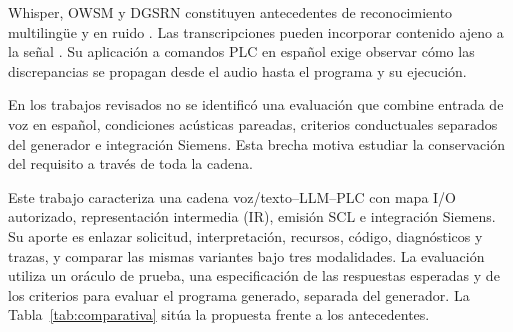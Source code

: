 \documentclass[a4paper,fleqn]{cas-dc}
\begin{document}
Whisper, OWSM y DGSRN constituyen antecedentes de reconocimiento multilingüe y en ruido \citep{radford2023whisper,peng2024owsm,peng2025owsm,wang2024dgsrn}. Las transcripciones pueden incorporar contenido ajeno a la señal \citep{koenecke2024careless}. Su aplicación a comandos PLC en español exige observar cómo las discrepancias se propagan desde el audio hasta el programa y su ejecución.

En los trabajos revisados no se identificó una evaluación que combine entrada de voz en español, condiciones acústicas pareadas, criterios conductuales separados del generador e integración Siemens. Esta brecha motiva estudiar la conservación del requisito a través de toda la cadena.

Este trabajo caracteriza una cadena voz/texto--LLM--PLC con mapa I/O autorizado, representación intermedia (IR), emisión SCL e integración Siemens. Su aporte es enlazar solicitud, interpretación, recursos, código, diagnósticos y trazas, y comparar las mismas variantes bajo tres modalidades. La evaluación utiliza un oráculo de prueba, una especificación de las respuestas esperadas y de los criterios para evaluar el programa generado, separada del generador. La Tabla~\ref{tab:comparativa} sitúa la propuesta frente a los antecedentes.
\end{document}
